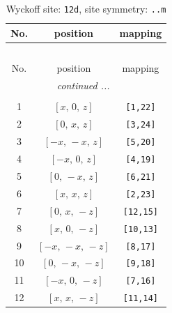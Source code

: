\documentclass[fleqn,8pt]{jsarticle}
\begin{document}
\renewcommand{\arraystretch}{1.2}
\begin{longtable}{ccc}
\caption{Wyckoff site: {\tt 12d}, site symmetry: {\tt ..m}}
 \\
 \hline \hline
No. & position & mapping \\ \hline \endfirsthead

\multicolumn{2}{l}{\tablename\ \thetable{}} \\
 \hline \hline
No. & position & mapping \\ \hline \endhead

 \hline \hline
\multicolumn{2}{r}{\footnotesize\it continued ...} \\ \endfoot

 \hline \hline
\multicolumn{2}{r}{} \\ \endlastfoot

1 & $\left[ x,\, 0,\, z \right]$ & {\tt [1,22]} \\ \hline
2 & $\left[ 0,\, x,\, z \right]$ & {\tt [3,24]} \\ \hline
3 & $\left[ - x,\, - x,\, z \right]$ & {\tt [5,20]} \\ \hline
4 & $\left[ - x,\, 0,\, z \right]$ & {\tt [4,19]} \\ \hline
5 & $\left[ 0,\, - x,\, z \right]$ & {\tt [6,21]} \\ \hline
6 & $\left[ x,\, x,\, z \right]$ & {\tt [2,23]} \\ \hline
7 & $\left[ 0,\, x,\, - z \right]$ & {\tt [12,15]} \\ \hline
8 & $\left[ x,\, 0,\, - z \right]$ & {\tt [10,13]} \\ \hline
9 & $\left[ - x,\, - x,\, - z \right]$ & {\tt [8,17]} \\ \hline
10 & $\left[ 0,\, - x,\, - z \right]$ & {\tt [9,18]} \\ \hline
11 & $\left[ - x,\, 0,\, - z \right]$ & {\tt [7,16]} \\ \hline
12 & $\left[ x,\, x,\, - z \right]$ & {\tt [11,14]} \\
\end{longtable}
\renewcommand{\arraystretch}{1.2}
\end{document}
